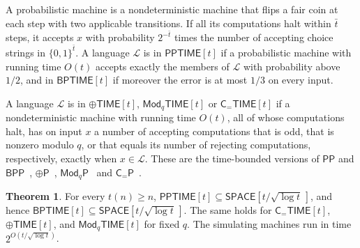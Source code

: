 \documentclass[11pt]{article}
\theoremstyle{definition}
\newtheorem{theorem}{Theorem}[section]
\theoremstyle{definition}
\theoremstyle{remark}
\newcommand{\SPACE}{\mathsf{SPACE}}
\newcommand{\BPTIME}{\mathsf{BPTIME}}
\newcommand{\PPTIME}{\mathsf{PPTIME}}
\newcommand{\ParTIME}{\oplus\mathsf{TIME}}
\newcommand{\ModTIME}{\mathsf{Mod}_q\mathsf{TIME}}
\newcommand{\CeqTIME}{\mathsf{C}_{=}\mathsf{TIME}}
\begin{document}
A probabilistic machine is a nondeterministic machine that flips a fair coin at each step with two applicable transitions. If all its computations halt within $\bar t$ steps, it accepts $x$ with probability $2^{-\bar t}$ times the number of accepting choice strings in $\{0,1\}^{\bar t}$. A language $\mathcal L$ is in $\PPTIME[t]$ if a probabilistic machine with running time $O(t)$ accepts exactly the members of $\mathcal L$ with probability above $1/2$, and in $\BPTIME[t]$ if moreover the error is at most $1/3$ on every input.

A language $\mathcal L$ is in $\ParTIME[t]$, $\ModTIME[t]$ or $\CeqTIME[t]$ if a nondeterministic machine with running time $O(t)$, all of whose computations halt, has on input $x$ a number of accepting computations that is odd, that is nonzero modulo $q$, or that equals its number of rejecting computations, respectively, exactly when $x\in\mathcal L$. These are the time-bounded versions of $\mathsf{PP}$ and $\mathsf{BPP}$~\cite{Gil77}, $\oplus\mathsf P$~\cite{PZ83}, $\mathsf{Mod}_q\mathsf P$~\cite{BG92} and $\mathsf C_=\mathsf P$~\cite{Wag86}.

\begin{theorem}\label{thm:counting-classes}
For every $t(n)\ge n$, $\PPTIME[t]\subseteq\SPACE[t/\sqrt{\log t}\,]$, and hence $\BPTIME[t]\subseteq\SPACE[t/\sqrt{\log t}\,]$. The same holds for $\CeqTIME[t]$, $\ParTIME[t]$, and $\ModTIME[t]$ for fixed $q$. The simulating machines run in time $2^{O(t/\sqrt{\log t})}$.
\end{theorem}
\end{document}
